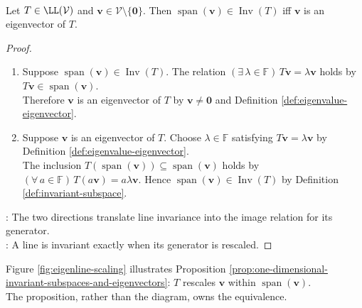\begin{proposition} \label{prop:one-dimensional-invariant-subspaces-and-eigenvectors} \\
Let $T\in\LL(\mathcal{V})$ and $\mathbf{v}\in\mathcal{V}\setminus\{\mathbf{0}\}$. Then $\operatorname{span}(\mathbf{v})\in\operatorname{Inv}(T)$ iff $\mathbf{v}$ is an eigenvector of $T$.
\begin{proof}
\begin{enumerate}[label=\roman*.]
\setlength{\itemsep}{0pt}
\item[$(\Rightarrow)$] Suppose $\operatorname{span}(\mathbf{v})\in\operatorname{Inv}(T)$. The relation $(\exists\,\lambda\in\mathbb{F})\,T\mathbf{v}=\lambda\mathbf{v}$ holds by $T\mathbf{v}\in\operatorname{span}(\mathbf{v})$.\\
Therefore $\mathbf{v}$ is an eigenvector of $T$ by $\mathbf{v}\neq\mathbf{0}$ and Definition \ref{def:eigenvalue-eigenvector}.
\item[$(\Leftarrow)$] Suppose $\mathbf{v}$ is an eigenvector of $T$. Choose $\lambda\in\mathbb{F}$ satisfying $T\mathbf{v}=\lambda\mathbf{v}$ by Definition \ref{def:eigenvalue-eigenvector}.\\
The inclusion $T(\operatorname{span}(\mathbf{v}))\subseteq\operatorname{span}(\mathbf{v})$ holds by $(\forall\,a\in\mathbb{F})\,T(a\mathbf{v})=a\lambda\mathbf{v}$. Hence $\operatorname{span}(\mathbf{v})\in\operatorname{Inv}(T)$ by Definition \ref{def:invariant-subspace}.
\end{enumerate}
: The two directions translate line invariance into the image relation for its generator.\\
: A line is invariant exactly when its generator is rescaled.
\end{proof}
\end{proposition}

Figure \ref{fig:eigenline-scaling} illustrates Proposition \ref{prop:one-dimensional-invariant-subspaces-and-eigenvectors}: $T$ rescales $\mathbf{v}$ within $\operatorname{span}(\mathbf{v})$.\\
The proposition, rather than the diagram, owns the equivalence.

\begin{illustrationfigure}[H]
  \centering
  
  \caption{An eigenvector and its image lie on the same invariant line.}
  \label{fig:eigenline-scaling}
\end{illustrationfigure}

